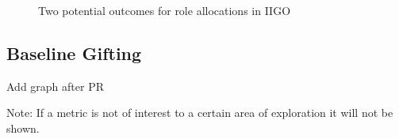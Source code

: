 \begin{figure}
    \centering
    \caption{Two potential outcomes for role allocations in IIGO}
    \label{fig:Simulations:iigo_roles}
\end{figure}

\subsection{Baseline Gifting}
\label{subsec:Simulations:baseline:trading}

Add graph after PR

Note: If a metric is not of interest to a certain area of exploration it will not be shown.